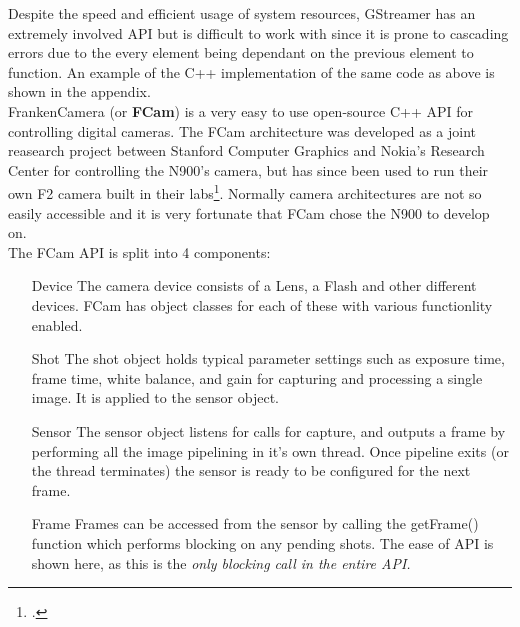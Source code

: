 \documentclass[11pt]{article} %
\begin{document}
Despite the speed and efficient usage of system resources, GStreamer has an extremely involved API but is difficult to work with since it is prone to cascading errors due to the every element being dependant on the previous element to function. An example of the C++ implementation of the same code as above is shown in the appendix.\\

FrankenCamera (or {\bf FCam}) is a very easy to use open-source C++ API for controlling digital cameras.  The FCam architecture was developed as a joint reasearch project between Stanford Computer Graphics and Nokia's Research Center for controlling the N900's camera, but has since been used to run their own F2 camera built in their labs\footcite{fcamdoc}. Normally camera architectures are not so easily accessible and it is very fortunate that FCam chose the N900 to develop on.
\pagebreak
\\The FCam API is split into 4 components:
\begin{enumerate}
\item[Device]{The camera device consists of a Lens, a Flash and other different devices. FCam has object classes for each of these with various functionlity enabled.}
\item[Shot]{The shot object holds typical parameter settings such as exposure time, frame time, white balance, and gain for capturing and processing a single image. It is applied to the sensor object.}
\item[Sensor]{The sensor object listens for calls for capture, and outputs a frame by performing all the image pipelining in it's own thread. Once pipeline exits (or the thread terminates) the sensor is ready to be configured for the next frame.}
\item[Frame]{Frames can be accessed from the sensor by calling the getFrame() function which performs blocking on any pending shots. The ease of API is shown here, as this is the \it{only} blocking call in the entire API.}
\end{enumerate}
\end{document}
